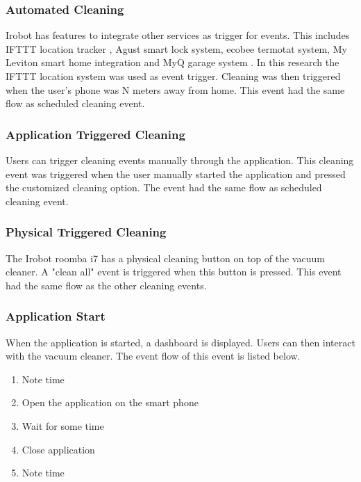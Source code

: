 \subsubsection{Automated Cleaning}
Irobot has features to integrate other services as trigger for events. This includes IFTTT location tracker \cite{ifttt}, Agust smart lock system, ecobee termotat system, My Leviton smart home integration and MyQ garage system \cite{irobot}. In this research the IFTTT location system was used as event trigger. Cleaning was then triggered when the user's phone was N meters away from home. This event had the same flow as scheduled cleaning event. 

\subsubsection{Application Triggered Cleaning}
Users can trigger cleaning events manually through the application. This cleaning event was triggered when the user manually started the application and pressed the customized cleaning option. The event had the same flow as scheduled cleaning event.


\subsubsection{Physical Triggered Cleaning}
The Irobot roomba i7 has a physical cleaning button on top of the vacuum cleaner. A "clean all" event is triggered when this button is pressed. This event had the same flow as the other cleaning events.

\subsubsection{Application Start}
When the application is started, a dashboard is displayed. Users can then interact with the vacuum cleaner. The event flow of this event is listed below. 

 \begin{enumerate}
                                    \item Note time
                                    \item Open the application on the smart phone
                                    \item Wait for some time
                                    \item Close application
                                    \item Note time
 \end{enumerate}



